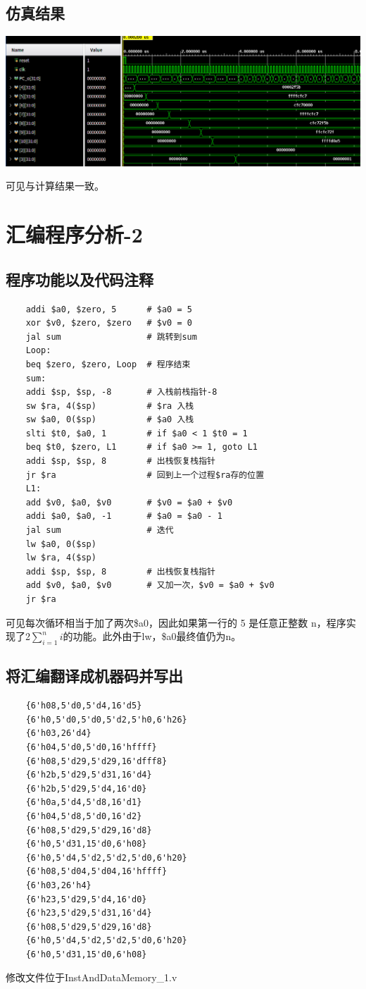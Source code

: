\documentclass{article}
\begin{document}
\subsection{仿真结果}
\begin{center}
    \includegraphics[width = 16cm]{images/sim_1_waveform.png}
\end{center}
可见与计算结果一致。

\section{汇编程序分析-2}
\subsection{程序功能以及代码注释}
\begin{lstlisting}
    addi $a0, $zero, 5      # $a0 = 5
    xor $v0, $zero, $zero   # $v0 = 0
    jal sum                 # 跳转到sum
    Loop:
    beq $zero, $zero, Loop  # 程序结束
    sum:
    addi $sp, $sp, -8       # 入栈前栈指针-8
    sw $ra, 4($sp)          # $ra 入栈
    sw $a0, 0($sp)          # $a0 入栈
    slti $t0, $a0, 1        # if $a0 < 1 $t0 = 1
    beq $t0, $zero, L1      # if $a0 >= 1, goto L1
    addi $sp, $sp, 8        # 出栈恢复栈指针
    jr $ra                  # 回到上一个过程$ra存的位置
    L1:
    add $v0, $a0, $v0       # $v0 = $a0 + $v0
    addi $a0, $a0, -1       # $a0 = $a0 - 1
    jal sum                 # 迭代
    lw $a0, 0($sp)          
    lw $ra, 4($sp)
    addi $sp, $sp, 8        # 出栈恢复栈指针
    add $v0, $a0, $v0       # 又加一次，$v0 = $a0 + $v0
    jr $ra
\end{lstlisting}
可见每次循环相当于加了两次\$a0，因此如果第一行的 5 是任意正整数 n，程序实现了2$\sum_{i=1}^ni$的功能。此外由于lw，\$a0最终值仍为n。
\subsection{将汇编翻译成机器码并写出}
\begin{lstlisting}
    {6'h08,5'd0,5'd4,16'd5}
    {6'h0,5'd0,5'd0,5'd2,5'h0,6'h26}
    {6'h03,26'd4}
    {6'h04,5'd0,5'd0,16'hffff}
    {6'h08,5'd29,5'd29,16'dfff8}
    {6'h2b,5'd29,5'd31,16'd4}
    {6'h2b,5'd29,5'd4,16'd0}
    {6'h0a,5'd4,5'd8,16'd1}
    {6'h04,5'd8,5'd0,16'd2}
    {6'h08,5'd29,5'd29,16'd8}
    {6'h0,5'd31,15'd0,6'h08}
    {6'h0,5'd4,5'd2,5'd2,5'd0,6'h20}
    {6'h08,5'd04,5'd04,16'hffff}
    {6'h03,26'h4}
    {6'h23,5'd29,5'd4,16'd0}
    {6'h23,5'd29,5'd31,16'd4}
    {6'h08,5'd29,5'd29,16'd8}
    {6'h0,5'd4,5'd2,5'd2,5'd0,6'h20}
    {6'h0,5'd31,15'd0,6'h08}
\end{lstlisting}
修改文件位于InstAndDataMemory\_1.v
\end{document}
